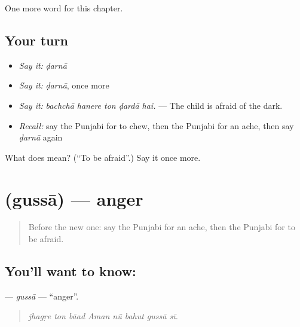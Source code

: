 \begin{grammarlens}[title={What you've built}]
One more word for this chapter.
\end{grammarlens}

\subsection*{Your turn}
\begin{itemize}
\raggedright
  \item \emph{Say it:} \emph{ḍarnā}
  \item \emph{Say it:} \emph{ḍarnā}, once more
  \item \emph{Say it:} \emph{bachchā hanere ton ḍardā hai.} — The child is afraid of the dark.
  \item \emph{Recall:} say the Punjabi for to chew, then the Punjabi for an ache, then say \emph{ḍarnā} again
\end{itemize}

\begin{tcolorbox}[breakable,colback=teal!4,colframe=teal!35!black,title={Before you move on}]
What does  mean? (\textquotedblleft{}To be afraid\textquotedblright{}.) Say it once more.
\end{tcolorbox}
\section[\texorpdfstring{\pa{ਗੁੱਸਾ} (gussā)}{ਗੁੱਸਾ (gussā)}]{ (gussā) — anger}

\label{lesson:PA-C326-gussa}



\begin{quote}
Before the new one: say the Punjabi for an ache, then the Punjabi for to be afraid.
\end{quote}

\subsection*{You'll want to know: }
\textbf{} — \emph{gussā} — \textquotedblleft{}anger\textquotedblright{}.

\begin{quote}
       
\end{quote}

\begin{quote}
\emph{jhagṛe ton bāad Aman nū̃ bahut gussā sī.}
\end{quote}

